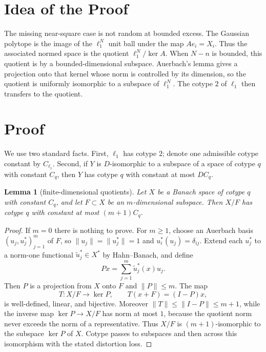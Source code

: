 \documentclass[11pt]{article}
\newtheorem{lemma}{Lemma}
\begin{document}
\section*{Idea of the Proof}

The missing near-square case is not random at bounded excess.  The Gaussian
polytope is the image of the $\ell_1^N$ unit ball under the map
$A e_i=X_i$.  Thus the associated normed space is the quotient
$\ell_1^N/\ker A$.  When $N-n$ is bounded, this quotient is by a
bounded-dimensional subspace.  Auerbach's lemma gives a projection onto that
kernel whose norm is controlled by its dimension, so the quotient is uniformly
isomorphic to a subspace of $\ell_1^N$.  The cotype $2$ of $\ell_1$ then
transfers to the quotient.

\section*{Proof}

We use two standard facts.  First, $\ell_1$ has cotype $2$; denote one
admissible cotype constant by $C_{\ell_1}$.  Second, if $Y$ is $D$-isomorphic
to a subspace of a space of cotype $q$ with constant $C_q$, then $Y$ has
cotype $q$ with constant at most $D C_q$.

\begin{lemma}[finite-dimensional quotients]
Let $X$ be a Banach space of cotype $q$ with constant $C_q$, and let
$F\subset X$ be an $m$-dimensional subspace.  Then $X/F$ has cotype $q$ with
constant at most $(m+1)C_q$.
\end{lemma}

\begin{proof}
If $m=0$ there is nothing to prove.  For $m\ge 1$, choose an Auerbach basis
$(u_j,u_j^*)_{j=1}^m$ of $F$, so $\|u_j\|=\|u_j^*\|=1$ and
$u_i^*(u_j)=\delta_{ij}$.  Extend each $u_j^*$ to a norm-one functional
$\widetilde u_j^*\in X^*$ by Hahn--Banach, and define
\[
  P x=\sum_{j=1}^m \widetilde u_j^*(x)u_j .
\]
Then $P$ is a projection from $X$ onto $F$ and $\|P\|\le m$.  The map
\[
  T:X/F\to \ker P,\qquad T(x+F)=(I-P)x,
\]
is well-defined, linear, and bijective.  Moreover
$\|T\|\le \|I-P\|\le m+1$, while the inverse map $\ker P\to X/F$ has norm at
most $1$, because the quotient norm never exceeds the norm of a representative.
Thus $X/F$ is $(m+1)$-isomorphic to the subspace $\ker P$ of $X$.  Cotype
passes to subspaces and then across this isomorphism with the stated
distortion loss.
\end{proof}
\end{document}
